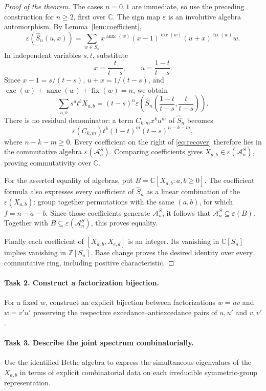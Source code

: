 \documentclass[11pt]{article}
\DeclareMathOperator{\exc}{exc}
\DeclareMathOperator{\anxc}{anxc}
\DeclareMathOperator{\fix}{fix}
\newcommand{\A}{\mathcal A_n^S}
\begin{document}
\begin{proof}[Proof of the theorem]
The cases \(n=0,1\) are immediate, so use the preceding construction
for \(n\geq2\), first over \(\mathbb C\).
The sign map \(\varepsilon\) is an involutive algebra automorphism.
By Lemma~\ref{lem:coefficient},
\[
\varepsilon(\widehat S_n(u,x))=
\sum_{w\in S_n}x^{\anxc(w)}(x-1)^{\exc(w)}
(u+x)^{\fix(w)}w.
\]
In independent variables \(s,t\), substitute
\[
x=\frac{t}{t-s},\qquad u=\frac{1-t}{t-s}.
\]
Since \(x-1=s/(t-s)\), \(u+x=1/(t-s)\), and
\(\exc(w)+\anxc(w)+\fix(w)=n\), we obtain
\begin{equation}\label{eq:recover}
\sum_{a,b}s^at^bX_{a,b}
=(t-s)^n\varepsilon\!\left(
\widehat S_n\!\left(\frac{1-t}{t-s},\frac{t}{t-s}\right)\right).
\end{equation}
There is no residual denominator: a term \(C_{k,m}x^ku^m\) of
\(\widehat S_n\) becomes
\[
\varepsilon(C_{k,m})t^k(1-t)^m(t-s)^{n-k-m},
\]
where \(n-k-m\geq0\). Every coefficient on the right of
\eqref{eq:recover} therefore lies in the commutative algebra
\(\varepsilon(\A)\). Comparing coefficients gives
\(X_{a,b}\in\varepsilon(\A)\), proving commutativity over \(\mathbb C\).

For the asserted equality of algebras, put
\(B=\mathbb C[X_{a,b}:a,b\geq0]\).
The coefficient formula also expresses every coefficient of
\(\widehat S_n\) as a linear combination of the \(\varepsilon(X_{a,b})\):
group together permutations with the same \((a,b)\), for which
\(f=n-a-b\). Since those coefficients generate \(\A\), it follows that
\(\A\subseteq\varepsilon(B)\).
Together with \(B\subseteq\varepsilon(\A)\), this proves equality.

Finally each coefficient of \([X_{a,b},X_{c,d}]\) is an integer.
Its vanishing in \(\mathbb C[S_n]\) implies vanishing in
\(\mathbb Z[S_n]\). Base change proves the desired identity over
every commutative ring, including positive characteristic.
\end{proof}

\paragraph{Task 2. Construct a factorization bijection.}
For a fixed \(w\), construct an explicit bijection between
factorizations \(w=uv\) and \(w=v'u'\) preserving the respective
excedance--antiexcedance pairs of \(u,u'\) and \(v,v'\).

\paragraph{Task 3. Describe the joint spectrum combinatorially.}
Use the identified Bethe algebra to express the simultaneous eigenvalues
of the \(X_{a,b}\) in terms of explicit combinatorial data on each
irreducible symmetric-group representation.
\end{document}
